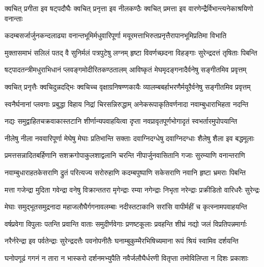 \twolineshloka
{क्वचित् प्रगीता इव षट्पदौघैः क्वचित् प्रनृत्ता इव नीलकण्ठैः}
{क्वचित् प्रमत्ता इव वारणेन्द्रैर्विभान्त्यनेकाश्रयिणो वनान्ताः} %

\twolineshloka
{कदम्बसर्जार्जुनकन्दलाढ्या वनान्तभूमिर्मधुवारिपूर्णा}
{मयूरमत्ताभिरुतप्रनृत्तैरापानभूमिप्रतिमा विभाति} %

\twolineshloka
{मुक्तासमाभं सलिलं पतद् वै सुनिर्मलं पत्रपुटेषु लग्नम्}
{हृष्टा विवर्णच्छदना विहङ्गाः सुरेन्द्रदत्तं तृषिताः पिबन्ति} %

\twolineshloka
{षट्पादतन्त्रीमधुराभिधानं प्लवङ्गमोदीरितकण्ठतालम्}
{आविष्कृतं मेघमृदङ्गनादैर्वनेषु सङ्गीतमिव प्रवृत्तम्} %

\twolineshloka
{क्वचित् प्रनृत्तैः क्वचिदुन्नदद्भिः क्वचिच्च वृक्षाग्रनिषण्णकायैः}
{व्यालम्बबर्हाभरणैर्मयूरैर्वनेषु सङ्गीतमिव प्रवृत्तम्} %

\twolineshloka
{स्वनैर्घनानां प्लवगाः प्रबुद्धा विहाय निद्रां चिरसन्निरुद्धाम्}
{अनेकरूपाकृतिवर्णनादा नवाम्बुधाराभिहता नदन्ति} %

\twolineshloka
{नद्यः समुद्वाहितचक्रवाकास्तटानि शीर्णान्यपवाहयित्वा}
{दृप्ता नवप्रावृतपूर्णभोगादृतं स्वभर्तारमुपोपयान्ति} %

\twolineshloka
{नीलेषु नीला नववारिपूर्णा मेघेषु मेघाः प्रतिभान्ति सक्ताः}
{दवाग्निदग्धेषु दवाग्निदग्धाः शैलेषु शैला इव बद्धमूलाः} %

\twolineshloka
{प्रमत्तसन्नादितबर्हिणानि सशक्रगोपाकुलशाद्वलानि}
{चरन्ति नीपार्जुनवासितानि गजाः सुरम्याणि वनान्तराणि} %

\twolineshloka
{नवाम्बुधाराहतकेसराणि द्रुतं परित्यज्य सरोरुहाणि}
{कदम्बपुष्पाणि सकेसराणि नवानि हृष्टा भ्रमराः पिबन्ति} %

\twolineshloka
{मत्ता गजेन्द्रा मुदिता गवेन्द्रा वनेषु विक्रान्ततरा मृगेन्द्राः}
{रम्या नगेन्द्राः निभृता नरेन्द्राः प्रक्रीडितो वारिधरैः सुरेन्द्रः} %

\twolineshloka
{मेघाः समुद्भूतसमुद्रनादा महाजलौघैर्गगनावलम्बाः}
{नदीस्तटाकानि सरांसि वापीर्महीं च कृत्स्नामपवाहयन्ति} %

\twolineshloka
{वर्षप्रवेगा विपुलाः पतन्ति प्रवान्ति वाताः समुदीर्णवेगाः}
{प्रणष्टकूलाः प्रवहन्ति शीघ्रं नद्यो जलं विप्रतिपन्नमार्गाः} %

\twolineshloka
{नरैर्नरेन्द्रा इव पर्वतेन्द्राः सुरेन्द्रदत्तैः पवनोपनीतैः}
{घनाम्बुकुम्भैरभिषिच्यमाना रूपं श्रियं स्वामिव दर्शयन्ति} %

\twolineshloka
{घनोपगूढं गगनं न तारा न भास्करो दर्शनमभ्युपैति}
{नवैर्जलौघैर्धरणी वितृप्ता तमोविलिप्ता न दिशः प्रकाशाः} %

